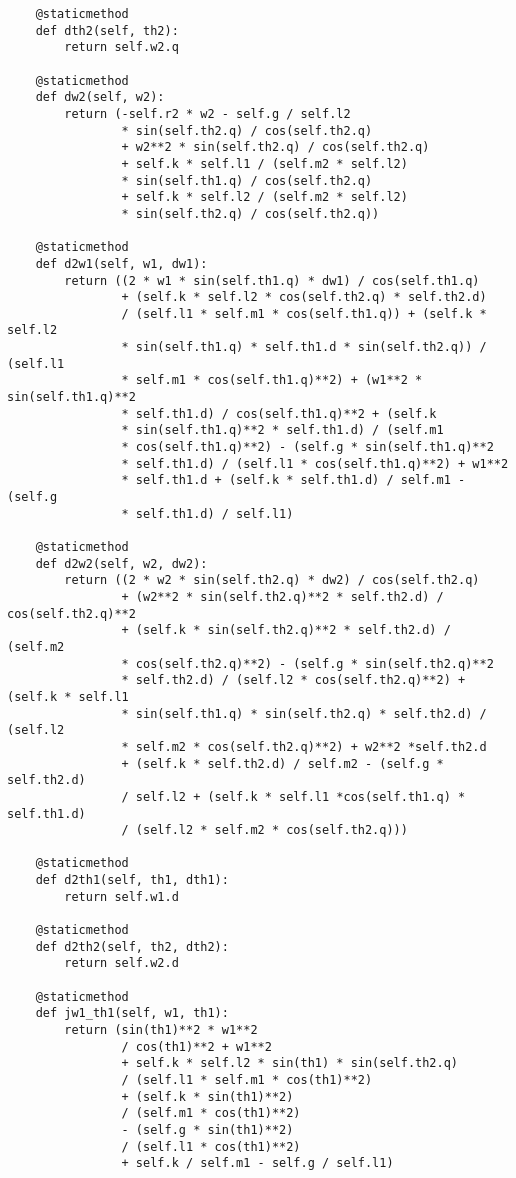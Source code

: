 \begin{lstlisting}
    @staticmethod
    def dth2(self, th2):
        return self.w2.q

    @staticmethod
    def dw2(self, w2):
        return (-self.r2 * w2 - self.g / self.l2
                * sin(self.th2.q) / cos(self.th2.q)
                + w2**2 * sin(self.th2.q) / cos(self.th2.q)
                + self.k * self.l1 / (self.m2 * self.l2)
                * sin(self.th1.q) / cos(self.th2.q)
                + self.k * self.l2 / (self.m2 * self.l2)
                * sin(self.th2.q) / cos(self.th2.q))

    @staticmethod
    def d2w1(self, w1, dw1):
        return ((2 * w1 * sin(self.th1.q) * dw1) / cos(self.th1.q)
                + (self.k * self.l2 * cos(self.th2.q) * self.th2.d)
                / (self.l1 * self.m1 * cos(self.th1.q)) + (self.k * self.l2
                * sin(self.th1.q) * self.th1.d * sin(self.th2.q)) / (self.l1
                * self.m1 * cos(self.th1.q)**2) + (w1**2 * sin(self.th1.q)**2
                * self.th1.d) / cos(self.th1.q)**2 + (self.k
                * sin(self.th1.q)**2 * self.th1.d) / (self.m1
                * cos(self.th1.q)**2) - (self.g * sin(self.th1.q)**2
                * self.th1.d) / (self.l1 * cos(self.th1.q)**2) + w1**2
                * self.th1.d + (self.k * self.th1.d) / self.m1 - (self.g
                * self.th1.d) / self.l1)

    @staticmethod
    def d2w2(self, w2, dw2):
        return ((2 * w2 * sin(self.th2.q) * dw2) / cos(self.th2.q)
                + (w2**2 * sin(self.th2.q)**2 * self.th2.d) / cos(self.th2.q)**2
                + (self.k * sin(self.th2.q)**2 * self.th2.d) / (self.m2
                * cos(self.th2.q)**2) - (self.g * sin(self.th2.q)**2
                * self.th2.d) / (self.l2 * cos(self.th2.q)**2) + (self.k * self.l1
                * sin(self.th1.q) * sin(self.th2.q) * self.th2.d) / (self.l2
                * self.m2 * cos(self.th2.q)**2) + w2**2 *self.th2.d
                + (self.k * self.th2.d) / self.m2 - (self.g * self.th2.d)
                / self.l2 + (self.k * self.l1 *cos(self.th1.q) * self.th1.d)
                / (self.l2 * self.m2 * cos(self.th2.q)))

    @staticmethod
    def d2th1(self, th1, dth1):
        return self.w1.d

    @staticmethod
    def d2th2(self, th2, dth2):
        return self.w2.d

    @staticmethod
    def jw1_th1(self, w1, th1):
        return (sin(th1)**2 * w1**2
                / cos(th1)**2 + w1**2
                + self.k * self.l2 * sin(th1) * sin(self.th2.q)
                / (self.l1 * self.m1 * cos(th1)**2)
                + (self.k * sin(th1)**2)
                / (self.m1 * cos(th1)**2)
                - (self.g * sin(th1)**2)
                / (self.l1 * cos(th1)**2)
                + self.k / self.m1 - self.g / self.l1)


\end{lstlisting}
